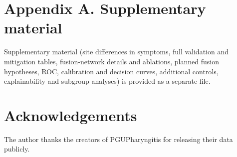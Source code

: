 \documentclass[preprint,12pt]{elsarticle}
\begin{document}
\section*{Appendix A. Supplementary material}
Supplementary material (site differences in symptoms, full validation and mitigation tables, fusion-network details and ablations, planned fusion hypotheses, ROC, calibration and decision curves, additional controls, explainability and subgroup analyses) is provided as a separate file.

\section*{Acknowledgements}
The author thanks the creators of PGUPharyngitis for releasing their data publicly.



\end{document}

